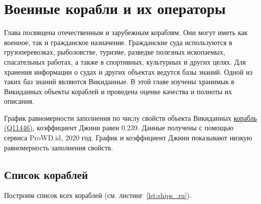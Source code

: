 \chapter{Военные корабли и их операторы}
\label{ch:ships-chapter}

Глава посвящена отечественным и зарубежным кораблям. Они могут иметь как военное, так и гражданское назначение. Гражданские суда используются в грузоперевозках, рыболовстве, туризме, разведке полезных ископаемых, спасательных работах, а также в спортивных, культурных и других целях. Для хранения информации о судах и других объектах ведутся базы знаний. Одной из таких баз знаний являются Викиданные. В этой главе изучены хранимык в Викиданных объекты кораблей и проведена оценке качества и полноты их описания.


\begin{marginfigure}[0.0cm]
  {
    \setlength{\fboxsep}{0pt}%
    \setlength{\fboxrule}{1pt}%
  }
  \caption[График равномерности заполнения свойств объектов Викиданных.]{График равномерности заполнения по числу свойств объекта Викиданных \href{https://www.wikidata.org/wiki/Q11446}{корабль (Q11446)}, коэффициент Джини равен 0.239. Данные получены с помощью сервиса ProWD.id, 2020 год. График и коэффициент Джини показывают низкую равномерность заполнения свойств.}%
  \label{fig:prowd_ships-unbalanced}%
\end{marginfigure}


\section{Список кораблей}


Построим список всех кораблей (см. листинг~\ref{lst:ships_ru}).

